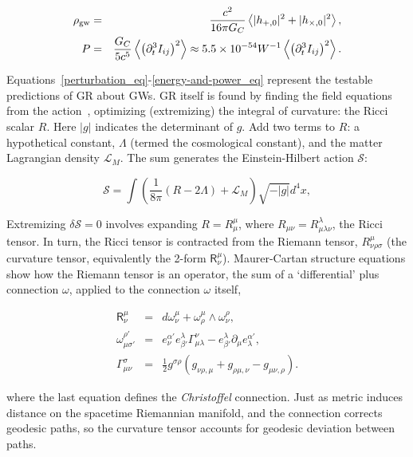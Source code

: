 \begin{eqnarray}
\rho_{\textup{gw}} &=& \frac{c^2}{16 \pi G_C} \left\langle |h_{+,0}|^2 + |h_{\times,0}|^2 \right\rangle,\\
P &=& \frac{G_C}{5c^5}\left\langle \left( \partial_t^3 I_{ij}\right)^2  \right\rangle \approx 5.5\times 10^{-54} W^{-1} \left\langle \left( \partial_t^3 I_{ij}\right)^2  \right\rangle.
\label{energy-and-power_eq}
\end{eqnarray}

Equations~\ref{perturbation_eq}-\ref{energy-and-power_eq} represent the testable predictions of GR about GWs. 
GR itself is found by finding the field equations from the action~\cite{FarrThesis}, optimizing (extremizing) the integral of curvature: the Ricci scalar $R$.
Here $|g|$ indicates the determinant of $g$. Add two terms to $R$: a hypothetical constant, $\Lambda$ (termed the cosmological constant), and the matter Lagrangian density $\mathcal{L}_M$. The sum generates the Einstein-Hilbert action $\mathcal{S}$:

\begin{equation}
\mathcal{S} = \int \left( \frac{1}{8\pi}\left(R - 2\Lambda\right) + \mathcal{L}_M \right) \sqrt{-|g|}d^4 x,
\end{equation}

Extremizing $\delta \mathcal{S} = 0$ involves expanding $R = R^\mu_\mu$, where $R_{\mu\nu} = R^\lambda_{\mu\lambda\nu}$, the Ricci tensor. 
In turn, the Ricci tensor is contracted from the Riemann tensor, $R^\mu_{\nu\rho\sigma}$ (the curvature tensor, equivalently the 2-form $\textsf{R}^\mu_\nu$). Maurer-Cartan structure equations show how the Riemann tensor is an operator, the sum of a `differential' plus connection $\omega$, applied to the connection $\omega$ itself,

\begin{eqnarray}
\textsf{R}^\mu_\nu &=& d\omega^\mu_\nu + \omega^\mu_\rho \wedge \omega^\rho_\nu, \\
\omega^{\rho'}_{\mu\sigma'} &=& e^{\alpha'}_{\nu} e^{\lambda}_{\beta'} \Gamma^{\nu}_{\mu\lambda} - e^{\lambda}_{\beta'} \partial_{\mu} e^{\alpha'}_{\lambda},\\
\Gamma^\sigma_{\mu\nu} &=& \frac{1}{2} g^{\sigma\rho} \left( g_{\nu \rho, \mu} + g_{\rho \mu, \nu} - g_{\mu\nu,\rho} \right). 
\end{eqnarray}

\noindent where the last equation defines the \textit{Christoffel} connection. Just as metric induces distance on the spacetime Riemannian manifold, and the connection corrects geodesic paths, so the curvature tensor accounts for geodesic deviation between paths.

